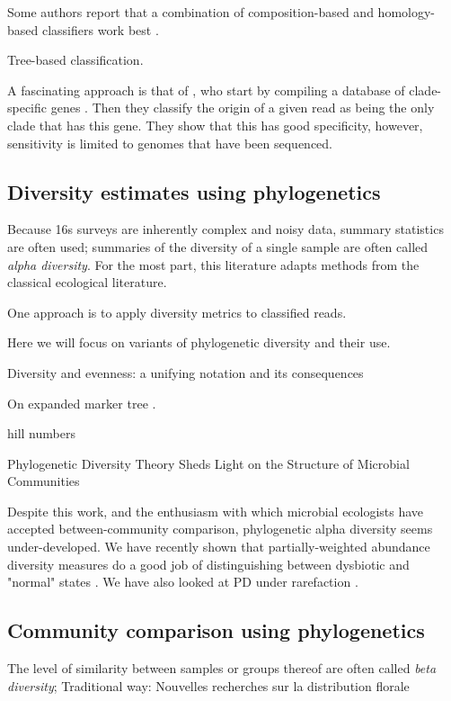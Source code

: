 \documentclass{amsart}
\begin{document}
Some authors report that a combination of composition-based and homology-based classifiers work best \citep{brady2009phymm,parks2011classifying}.

Tree-based classification.

A fascinating approach is that of \citet{segata2012metagenomic}, who start by compiling a database of clade-specific genes \citep{segata2011metagenomic}.
Then they classify the origin of a given read as being the only clade that has this gene.
They show that this has good specificity, however, sensitivity is limited to genomes that have been sequenced.


\subsection{Diversity estimates using phylogenetics}
Because 16s surveys are inherently complex and noisy data, summary statistics are often used; summaries of the diversity of a single sample are often called \emph{alpha diversity}.
For the most part, this literature adapts methods from the classical ecological literature.

One approach is to apply diversity metrics to classified reads.

Here we will focus on variants of phylogenetic diversity and their use.

\citep{hill1973diversity}
Diversity and evenness: a unifying notation and its consequences

On expanded marker tree \citep{kembel2011phylogenetic}.

hill numbers
\citep{chao2010phylogenetic}

\citep{odwyer2012phylogenetic}
Phylogenetic Diversity Theory Sheds Light on the Structure of Microbial Communities

Despite this work, and the enthusiasm with which microbial ecologists have accepted between-community comparison, phylogenetic alpha diversity seems under-developed.
We have recently shown that partially-weighted abundance diversity measures do a good job of distinguishing between dysbiotic and "normal" states \citep{mccoy2013abundance}.
We have also looked at PD under rarefaction \citep{nipperess2013mean}.


\subsection{Community comparison using phylogenetics}

The level of similarity between samples or groups thereof are often called \emph{beta diversity};
Traditional way: \citep{jaccard1908nouvelles} Nouvelles recherches sur la distribution florale
\end{document}
